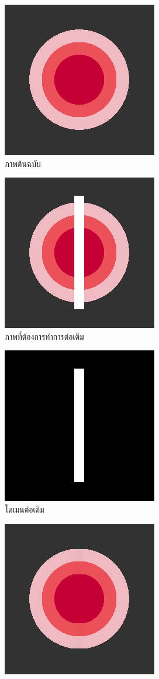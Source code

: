 \documentclass[hidelinks,a4paper,14pt]{article}
\numberwithin{equation}{section}							%
\begin{document}
{\begin{figure}[H]
	\centering
	\begin{subfigure}{0.4\linewidth}
		\centering
		\includegraphics[width=0.4\linewidth]{images/color_inpaint/original.png}
		\caption{ภาพต้นฉบับ}
	\end{subfigure}
	\begin{subfigure}{0.4\linewidth}
		\centering
		\includegraphics[width=0.4\linewidth]{images/color_inpaint/toinpaint.png}
		\caption{ภาพที่ต้องการทำการต่อเติม}
	\end{subfigure}
	\begin{subfigure}{0.4\linewidth}
		\centering
		\includegraphics[width=0.4\linewidth]{images/color_inpaint/inpaintdomain.png}
		\caption{โดเมนต่อเติม}
	\end{subfigure}
	\begin{subfigure}{0.4\linewidth}
		\centering
		\includegraphics[width=0.4\linewidth]{images/color_inpaint/result_splitbergman.png}

\end{subfigure}
\end{figure}}
\end{document}
